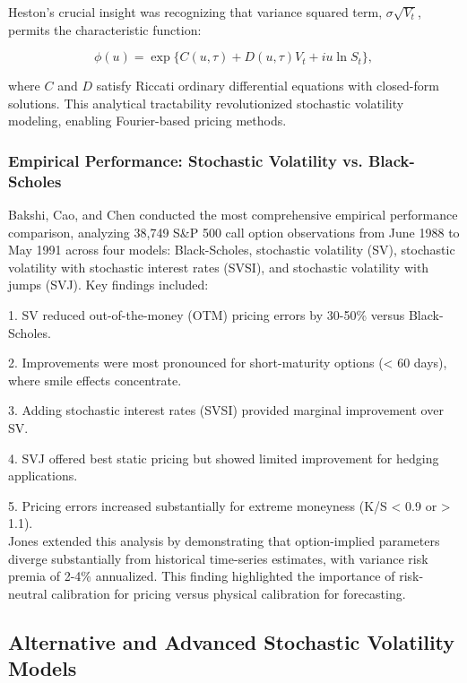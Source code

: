 \documentclass[12pt,a4paper]{article}
\begin{document}
Heston's crucial insight was recognizing that variance squared term, $\sigma\sqrt{V_t}$, permits the characteristic function:

\begin{equation}
\phi(u) = \exp\{C(u, \tau) + D(u, \tau) V_t + iu \ln S_t\},
\end{equation}

where $C$ and $D$ satisfy Riccati ordinary differential equations with closed-form solutions. This analytical tractability revolutionized stochastic volatility modeling, enabling Fourier-based pricing methods.

\subsubsection{Empirical Performance: Stochastic Volatility vs. Black-Scholes}

Bakshi, Cao, and Chen \cite{BakshiCaoChen1997} conducted the most comprehensive empirical performance comparison, analyzing 38,749 S\&P 500 call option observations from June 1988 to May 1991 across four models: Black-Scholes, stochastic volatility (SV), stochastic volatility with stochastic interest rates (SVSI), and stochastic volatility with jumps (SVJ). Key findings included:

1. SV reduced out-of-the-money (OTM) pricing errors by 30-50\% versus Black-Scholes.

2. Improvements were most pronounced for short-maturity options (< 60 days), where smile effects concentrate.

3. Adding stochastic interest rates (SVSI) provided marginal improvement over SV.

4. SVJ offered best static pricing but showed limited improvement for hedging applications.

5. Pricing errors increased substantially for extreme moneyness (K/S < 0.9 or > 1.1).\\[0.05cm]

Jones \cite{Jones2003} extended this analysis by demonstrating that option-implied parameters diverge substantially from historical time-series estimates, with variance risk premia of 2-4\% annualized. This finding highlighted the importance of risk-neutral calibration for pricing versus physical calibration for forecasting.

\subsection{Alternative and Advanced Stochastic Volatility Models}
\end{document}
